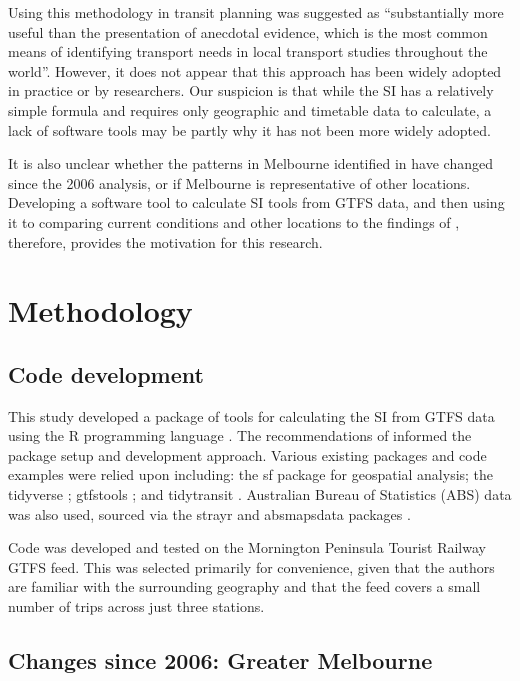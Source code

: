 \documentclass[preprint, 3p,
authoryear]{elsarticle} %
\begin{document}
Using this methodology in transit planning was suggested as
``substantially more useful than the presentation of anecdotal evidence,
which is the most common means of identifying transport needs in local
transport studies throughout the world''\citep{currie2010identifying}.
However, it does not appear that this approach has been widely adopted
in practice or by researchers. Our suspicion is that while the SI has a
relatively simple formula and requires only geographic and timetable
data to calculate, a lack of software tools may be partly why it has not
been more widely adopted.

It is also unclear whether the patterns in Melbourne identified in
\citet{currie2010identifying} have changed since the 2006 analysis, or
if Melbourne is representative of other locations. Developing a software
tool to calculate SI tools from GTFS data, and then using it to
comparing current conditions and other locations to the findings of
\citet{currie2010identifying}, therefore, provides the motivation for
this research.

\section{Methodology}\label{methodology}

\subsection{Code development}\label{code-development}

This study developed a package of tools for calculating the SI from GTFS
data using the R programming language \citep{R-base}. The
recommendations of \citet{wickham2023r} informed the package setup and
development approach. Various existing packages and code examples were
relied upon including: the sf package \citep{R-sf} for geospatial
analysis; the tidyverse \citep{tidyverse2019}; gtfstools
\citep{R-gtfstools}; and tidytransit \citep{R-tidytransit}. Australian
Bureau of Statistics (ABS) data was also used, sourced via the strayr
and absmapsdata packages \citep{r-strayr}.

Code was developed and tested on the Mornington Peninsula Tourist
Railway GTFS feed. This was selected primarily for convenience, given
that the authors are familiar with the surrounding geography and that
the feed covers a small number of trips across just three stations.

\subsection{Changes since 2006: Greater
Melbourne}\label{changes-since-2006-greater-melbourne}
\end{document}
